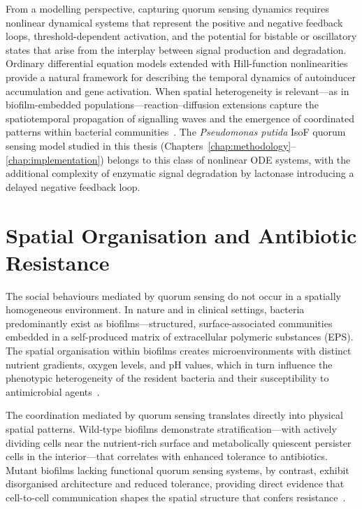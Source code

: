 \documentclass[14pt,a4paper,openany]{extbook}
\begin{document}
From a modelling perspective, capturing quorum sensing dynamics requires nonlinear dynamical systems that represent the positive and negative feedback loops, threshold-dependent activation, and the potential for bistable or oscillatory states that arise from the interplay between signal production and degradation. Ordinary differential equation models extended with Hill-function nonlinearities provide a natural framework for describing the temporal dynamics of autoinducer accumulation and gene activation. When spatial heterogeneity is relevant---as in biofilm-embedded populations---reaction--diffusion extensions capture the spatiotemporal propagation of signalling waves and the emergence of coordinated patterns within bacterial communities~\cite{kuttler2017reaction}. The \textit{Pseudomonas putida} IsoF quorum sensing model studied in this thesis (Chapters~\ref{chap:methodology}--\ref{chap:implementation}) belongs to this class of nonlinear ODE systems, with the additional complexity of enzymatic signal degradation by lactonase introducing a delayed negative feedback loop.


\section{Spatial Organisation and Antibiotic Resistance}
\label{sec:biofilms}

The social behaviours mediated by quorum sensing do not occur in a spatially homogeneous environment. In nature and in clinical settings, bacteria predominantly exist as biofilms---structured, surface-associated communities embedded in a self-produced matrix of extracellular polymeric substances (EPS). The spatial organisation within biofilms creates microenvironments with distinct nutrient gradients, oxygen levels, and pH values, which in turn influence the phenotypic heterogeneity of the resident bacteria and their susceptibility to antimicrobial agents~\cite{haidar2024}.

The coordination mediated by quorum sensing translates directly into physical spatial patterns. Wild-type biofilms demonstrate stratification---with actively dividing cells near the nutrient-rich surface and metabolically quiescent persister cells in the interior---that correlates with enhanced tolerance to antibiotics. Mutant biofilms lacking functional quorum sensing systems, by contrast, exhibit disorganised architecture and reduced tolerance, providing direct evidence that cell-to-cell communication shapes the spatial structure that confers resistance~\cite{haidar2024}.
\end{document}
